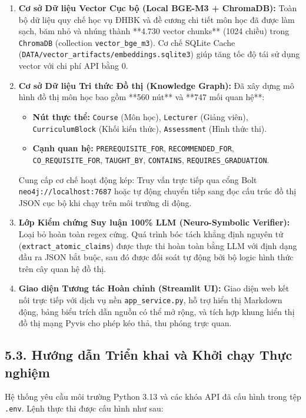 \documentclass[a4paper,12pt]{article}
\begin{document}
\begin{enumerate}[leftmargin=1.0cm]
    \item \textbf{Cơ sở Dữ liệu Vector Cục bộ (Local BGE-M3 + ChromaDB):}
    Toàn bộ dữ liệu quy chế học vụ ĐHBK và đề cương chi tiết môn học đã được làm sạch, băm nhỏ và nhúng thành **4.730 vector chunks** (1024 chiều) trong \texttt{ChromaDB} (collection \texttt{vector\_bge\_m3}). Cơ chế SQLite Cache (\texttt{DATA/vector\_artifacts/embeddings.sqlite3}) giúp tăng tốc độ tái sử dụng vector với chi phí API bằng 0.
    
    \item \textbf{Cơ sở Dữ liệu Tri thức Đồ thị (Knowledge Graph):}
    Đã xây dựng mô hình đồ thị môn học bao gồm **560 nút** và **747 mối quan hệ**:
    \begin{itemize}[noitemsep]
        \item \textbf{Nút thực thể:} \texttt{Course} (Môn học), \texttt{Lecturer} (Giảng viên), \texttt{CurriculumBlock} (Khối kiến thức), \texttt{Assessment} (Hình thức thi).
        \item \textbf{Cạnh quan hệ:} \texttt{PREREQUISITE\_FOR}, \texttt{RECOMMENDED\_FOR}, \texttt{CO\_REQUISITE\_FOR}, \texttt{TAUGHT\_BY}, \texttt{CONTAINS}, \texttt{REQUIRES\_GRADUATION}.
    \end{itemize}
    Cung cấp cơ chế hoạt động kép: Truy vấn trực tiếp qua cổng Bolt \texttt{neo4j://localhost:7687} hoặc tự động chuyển tiếp sang đọc cấu trúc đồ thị JSON cục bộ khi chạy trên môi trường di động.

    \item \textbf{Lớp Kiểm chứng Suy luận 100\% LLM (Neuro-Symbolic Verifier):}
    Loại bỏ hoàn toàn regex cứng. Quá trình bóc tách khẳng định nguyên tử (\texttt{extract\_atomic\_claims}) được thực thi hoàn toàn bằng LLM với định dạng đầu ra JSON bắt buộc, sau đó được đối soát tự động bởi bộ logic hình thức trên cây quan hệ đồ thị.

    \item \textbf{Giao diện Tương tác Hoàn chỉnh (Streamlit UI):}
    Giao diện web kết nối trực tiếp với dịch vụ nền \texttt{app\_service.py}, hỗ trợ hiển thị Markdown động, bảng biểu trích dẫn nguồn có thể mở rộng, và tích hợp khung hiển thị đồ thị mạng Pyvis cho phép kéo thả, thu phóng trực quan.
\end{enumerate}

\subsection{5.3. Hướng dẫn Triển khai và Khởi chạy Thực nghiệm}
Hệ thống yêu cầu môi trường Python 3.13 và các khóa API đã cấu hình trong tệp \texttt{.env}. Lệnh thực thi được cấu hình như sau:
\end{document}
